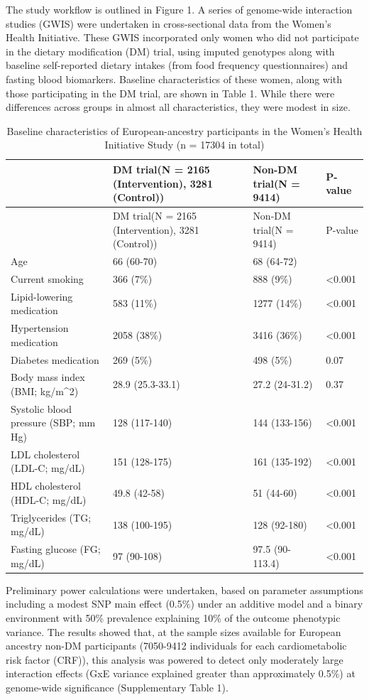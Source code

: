 \documentclass[]{article}
\begin{document}
The study workflow is outlined in Figure 1. A series of genome-wide
interaction studies (GWIS) were undertaken in cross-sectional data from
the Women's Health Initiative. These GWIS incorporated only women who
did not participate in the dietary modification (DM) trial, using
imputed genotypes along with baseline self-reported dietary intakes
(from food frequency questionnaires) and fasting blood biomarkers.
Baseline characteristics of these women, along with those participating
in the DM trial, are shown in Table 1. While there were differences
across groups in almost all characteristics, they were modest in size.

\begin{longtable}[]{@{}llll@{}}
\caption{Baseline characteristics of European-ancestry participants in
the Women's Health Initiative Study (n = 17304 in total)}\tabularnewline
\toprule
& DM trial\n(N = 2165 (Intervention), 3281 (Control)) & Non-DM trial\n(N
= 9414) & P-value\tabularnewline
\midrule
\endfirsthead
\toprule
& DM trial\n(N = 2165 (Intervention), 3281 (Control)) & Non-DM trial\n(N
= 9414) & P-value\tabularnewline
\midrule
\endhead
Age & 66 (60-70) & 68 (64-72) &\tabularnewline
Current smoking & 366 (7\%) & 888 (9\%) &
\textless{}0.001\tabularnewline
Lipid-lowering medication & 583 (11\%) & 1277 (14\%) &
\textless{}0.001\tabularnewline
Hypertension medication & 2058 (38\%) & 3416 (36\%) &
\textless{}0.001\tabularnewline
Diabetes medication & 269 (5\%) & 498 (5\%) & 0.07\tabularnewline
Body mass index (BMI; kg/m\^{}2) & 28.9 (25.3-33.1) & 27.2 (24-31.2) &
0.37\tabularnewline
Systolic blood pressure (SBP; mm Hg) & 128 (117-140) & 144 (133-156) &
\textless{}0.001\tabularnewline
LDL cholesterol (LDL-C; mg/dL) & 151 (128-175) & 161 (135-192) &
\textless{}0.001\tabularnewline
HDL cholesterol (HDL-C; mg/dL) & 49.8 (42-58) & 51 (44-60) &
\textless{}0.001\tabularnewline
Triglycerides (TG; mg/dL) & 138 (100-195) & 128 (92-180) &
\textless{}0.001\tabularnewline
Fasting glucose (FG; mg/dL) & 97 (90-108) & 97.5 (90-113.4) &
\textless{}0.001\tabularnewline
\bottomrule
\end{longtable}

Preliminary power calculations were undertaken, based on parameter
assumptions including a modest SNP main effect (0.5\%) under an additive
model and a binary environment with 50\% prevalence explaining 10\% of
the outcome phenotypic variance. The results showed that, at the sample
sizes available for European ancestry non-DM participants (7050-9412
individuals for each cardiometabolic risk factor (CRF)), this analysis
was powered to detect only moderately large interaction effects (GxE
variance explained greater than approximately 0.5\%) at genome-wide
significance (Supplementary Table 1).
\end{document}
